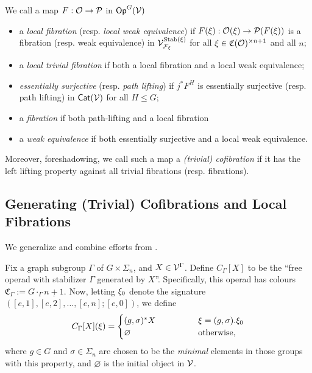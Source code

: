 \documentclass[psamsfonts,oneside,10pt,letterpaper
,draft
]{amsart}%
\renewcommand{\C}{\ensuremath{\mathfrak{C}}}
\renewcommand{\F}{\mathcal F}
\renewcommand{\1}{\ensuremath{\mathbb{id}}}
\renewcommand{\P}{\ensuremath{\mathcal{P}}}
\begin{document}
\begin{definition}
      We call a map $F: \O \to \P$ in $\mathsf{Op}^G(\mathcal V)$
      \begin{itemize}
      \item a {\em local fibration} (resp. {\em local weak equivalence}) if
            $F(\ksi): \O(\ksi)\to \P(F(\ksi))$
            is a fibration (resp. weak equivalence) in $\V^{\Stab(\ksi)}_{\F_\ksi}$ for all $\ksi\in \C(\O)^{\times n+1}$ and all $n$;
      \item a {\em local trivial fibration} if both a local fibration and a local weak equivalence;
      \item {\em essentially surjective} (resp. {\em path lifting}) if $j^*F^H$ is essentially surjective (resp. path lifting) in $\mathsf{Cat}(\mathcal V)$ for all $H\leq G$;
      \item a {\em fibration} if both path-lifting and a local fibration
      \item a {\em weak equivalence} if both essentially surjective and a local weak equivalence.
      \end{itemize}

      Moreover, foreshadowing, we call such a map
      a \textit{(trivial) cofibration} if it has the left lifting property against all trivial fibrations (resp. fibrations).
\end{definition}

\subsection{Generating (Trivial) Cofibrations and Local Fibrations}

We generalize and combine efforts from \cite{CM13b, BM13, Cav14}.

Fix a graph subgroup $\Gamma$ of $G \times \Sigma_n$, and $X \in \mathcal V^\Gamma$.
Define $C_\Gamma[X]$ to be the ``free operad with stabilizer $\Gamma$ generated by $X$''.
Specifically, this operad has colours $\mathfrak C_\Gamma := G \cdot_\Gamma \underline{n+1}$.
Now, letting $\xi_0$ denote the signature $([e,1],[e,2],\dots,[e,n];[e,0])$,
we define
\begin{equation}
      C_\Gamma[X](\ksi) =
      \begin{cases}
            (g,\sigma)^{\**} X \qquad \qquad & \ksi = (g,\sigma).\ksi_0
            \\
            \varnothing & \mbox{otherwise,}
      \end{cases}
\end{equation}
where $g \in G$ and $\sigma \in \Sigma_n$ are chosen to be the \textit{minimal} elements in those groups with this property,
and $\varnothing$ is the initial object in $\mathcal V$.
\end{document}
